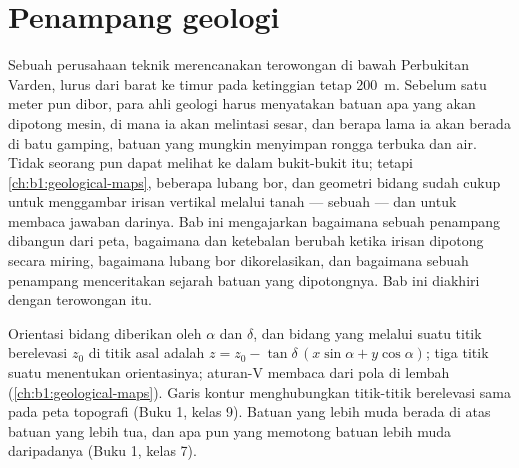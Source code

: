 \chapter{Penampang geologi}\label{ch:b1:cross-sections}

Sebuah perusahaan teknik merencanakan terowongan di bawah Perbukitan Varden, lurus dari barat ke timur pada ketinggian tetap \qty{200}{m}. Sebelum satu meter pun dibor, para ahli geologi harus menyatakan batuan apa yang akan dipotong mesin, di mana ia akan melintasi sesar, dan berapa lama ia akan berada di batu gamping, batuan yang mungkin menyimpan rongga terbuka dan air. Tidak seorang pun dapat melihat ke dalam bukit-bukit itu; tetapi  \cref{ch:b1:geological-maps}, beberapa lubang bor, dan geometri bidang sudah cukup untuk menggambar irisan vertikal melalui tanah --- sebuah  --- dan untuk membaca jawaban darinya. Bab ini mengajarkan bagaimana sebuah penampang dibangun dari peta, bagaimana  dan ketebalan berubah ketika irisan dipotong secara miring, bagaimana lubang bor dikorelasikan, dan bagaimana sebuah penampang menceritakan sejarah batuan yang dipotongnya. Bab ini diakhiri dengan terowongan itu.

\begin{recall}
Orientasi bidang diberikan oleh  $\alpha$ dan  $\delta$, dan bidang yang melalui suatu titik berelevasi $z_0$ di titik asal adalah $z = z_0 - \tan\delta\,(x\sin\alpha + y\cos\alpha)$; tiga titik suatu  menentukan orientasinya; aturan-V membaca  dari pola  di lembah (\cref{ch:b1:geological-maps}). Garis kontur menghubungkan titik-titik berelevasi sama pada peta topografi (Buku 1, kelas 9). Batuan yang lebih muda berada di atas batuan yang lebih tua, dan apa pun yang memotong batuan lebih muda daripadanya (Buku 1, kelas 7).
\end{recall}

